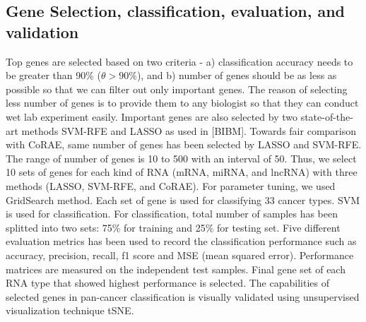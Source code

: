 \documentclass{bioinfo}
\begin{document}
\subsection{Gene Selection, classification, evaluation, and validation}
Top genes are selected based on two criteria - a) classification accuracy needs to be greater than 90\% ($ \theta > 90\% $),
and b) number of genes should be as less as possible so that we can filter out only important genes. The reason of
selecting less number of genes is to provide them to any biologist so that they can conduct wet lab experiment
easily. Important genes are also selected by two state-of-the-art methods SVM-RFE and LASSO as used in [BIBM]. Towards fair comparison
with CoRAE, same number of genes has been selected by LASSO and SVM-RFE. The range of number of genes is 10 to 500
with an interval of 50. Thus, we select 10 sets of genes for each kind of RNA (mRNA, miRNA, and lncRNA) with three
methods (LASSO, SVM-RFE, and CoRAE). For parameter tuning, we used GridSearch method. Each set of gene is used for classifying 33 cancer types. SVM is used for
classification. For classification, total number of samples has been splitted into two sets: 75\% for training and
25\% for testing set. Five different evaluation metrics has been used to record the classification performance such
as accuracy, precision, recall, f1 score and MSE (mean squared error). Performance matrices are measured on the independent test
samples. Final gene set of each RNA type that showed highest performance is selected. The capabilities of selected
genes in pan-cancer classification is visually validated using unsupervised visualization technique tSNE.
\end{document}

